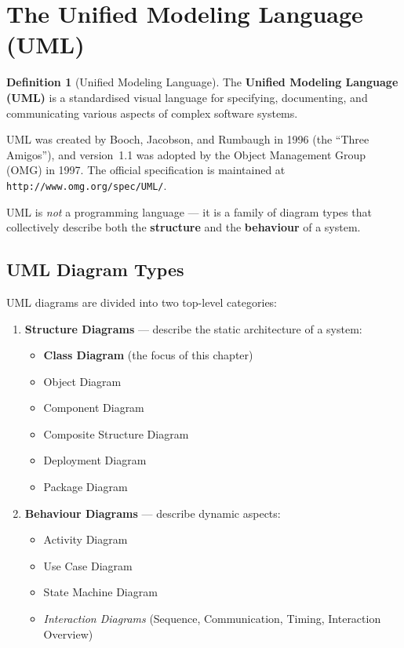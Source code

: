 \documentclass[11pt, a4paper, notitlepage]{report}
\theoremstyle{definition}
\newtheorem{definition}[theorem]{Definition}
\theoremstyle{remark}
\theoremstyle{definition}
\begin{document}
\section{The Unified Modeling Language (UML)}
\label{sec:ch6-uml}

\begin{definition}[Unified Modeling Language]
\label{def:ch6-uml}
The \textbf{Unified Modeling Language (UML)} is a standardised visual language
for specifying, documenting, and communicating various aspects of complex
software systems.
\end{definition}

UML was created by Booch, Jacobson, and Rumbaugh in 1996 (the ``Three
Amigos''), and version~1.1 was adopted by the Object Management Group (OMG) in
1997.  The official specification is maintained at
\texttt{http://www.omg.org/spec/UML/}.

UML is \emph{not} a programming language --- it is a family of diagram types
that collectively describe both the \textbf{structure} and the
\textbf{behaviour} of a system.

\subsection{UML Diagram Types}
\label{subsec:ch6-diagram-types}

UML diagrams are divided into two top-level categories:

\begin{enumerate}
  \item \textbf{Structure Diagrams} --- describe the static architecture of a
    system:
    \begin{itemize}[noitemsep]
      \item \textbf{Class Diagram} (the focus of this chapter)
      \item Object Diagram
      \item Component Diagram
      \item Composite Structure Diagram
      \item Deployment Diagram
      \item Package Diagram
    \end{itemize}

  \item \textbf{Behaviour Diagrams} --- describe dynamic aspects:
    \begin{itemize}[noitemsep]
      \item Activity Diagram
      \item Use Case Diagram
      \item State Machine Diagram
      \item \textit{Interaction Diagrams} (Sequence, Communication, Timing,
            Interaction Overview)
    \end{itemize}
\end{enumerate}
\end{document}
